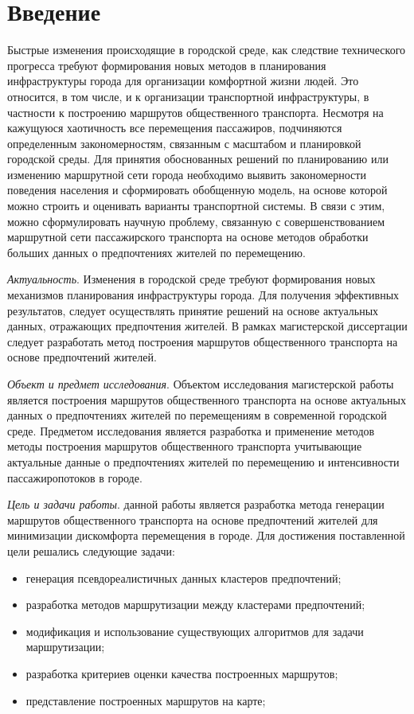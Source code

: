 \part{Введение}
Быстрые изменения происходящие в городской среде, как следствие технического прогресса требуют формирования 
новых методов в планирования инфраструктуры города для организации комфортной жизни людей. Это относится, в 
том числе, и к организации транспортной инфраструктуры, в частности к построению маршрутов общественного 
транспорта. Несмотря на кажущуюся хаотичность все перемещения пассажиров, подчиняются определенным 
закономерностям, связанным с масштабом и планировкой городской среды. Для принятия обоснованных решений по 
планированию или изменению маршрутной сети города необходимо выявить закономерности поведения населения и 
сформировать обобщенную модель, на основе которой можно строить и оценивать варианты транспортной системы. 
В связи с этим, можно сформулировать научную проблему, связанную с совершенствованием маршрутной сети 
пассажирского транспорта на основе методов обработки больших данных о предпочтениях жителей по перемещению. 

\emph{Актуальность}. Изменения в городской среде требуют формирования новых механизмов планирования 
инфраструктуры города. Для получения эффективных результатов, следует осуществлять принятие решений на основе 
актуальных данных, отражающих предпочтения жителей. В рамках магистерской диссертации следует разработать 
метод построения маршрутов общественного транспорта на основе предпочтений жителей.

\emph{Объект и предмет исследования}. Объектом исследования магистерской работы является построения маршрутов 
общественного транспорта на основе актуальных данных о предпочтениях жителей по перемещениям в современной 
городской среде. Предметом исследования является разработка и применение методов методы построения маршрутов 
общественного транспорта учитывающие актуальные данные о предпочтениях жителей по перемещению и интенсивности 
пассажиропотоков в городе.

\emph{Цель и задачи работы}. данной работы является разработка метода генерации маршрутов общественного 
транспорта на основе предпочтений жителей для минимизации дискомфорта перемещения в городе. Для достижения 
поставленной цели решались следующие задачи:
\begin{itemize}
    \item генерация псевдореалистичных данных кластеров предпочтений;
    \item разработка методов маршрутизации между кластерами предпочтений;
    \item модификация и использование существующих алгоритмов для задачи маршрутизации;
    \item разработка критериев оценки качества построенных маршрутов;
    \item представление построенных маршрутов на карте;
\end{itemize}

